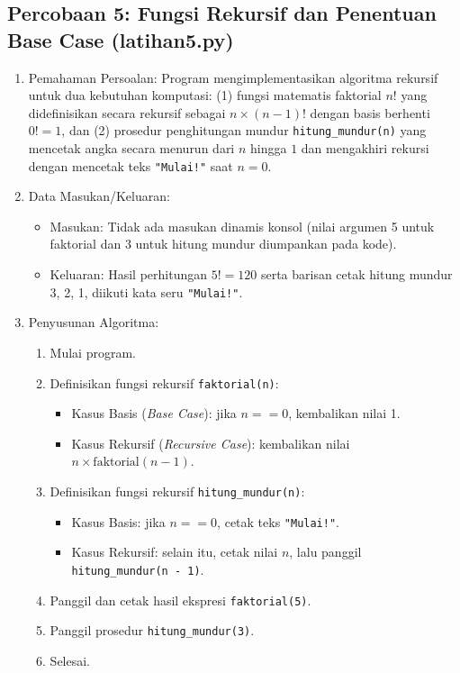 \documentclass[12pt,a4paper]{article}
\begin{document}
\subsection{Percobaan 5: Fungsi Rekursif dan Penentuan Base Case (latihan5.py)}
\begin{enumerate}
    \item Pemahaman Persoalan: Program mengimplementasikan algoritma rekursif untuk dua kebutuhan komputasi: (1) fungsi matematis faktorial $n!$ yang didefinisikan secara rekursif sebagai $n \times (n-1)!$ dengan basis berhenti $0! = 1$, dan (2) prosedur penghitungan mundur \texttt{hitung\_mundur(n)} yang mencetak angka secara menurun dari $n$ hingga $1$ dan mengakhiri rekursi dengan mencetak teks \texttt{"Mulai!"} saat $n = 0$.
    \item Data Masukan/Keluaran:
    \begin{itemize}
        \item Masukan: Tidak ada masukan dinamis konsol (nilai argumen 5 untuk faktorial dan 3 untuk hitung mundur diumpankan pada kode).
        \item Keluaran: Hasil perhitungan $5! = 120$ serta barisan cetak hitung mundur 3, 2, 1, diikuti kata seru \texttt{"Mulai!"}.
    \end{itemize}
    \item Penyusunan Algoritma:
    \begin{enumerate}[label=\alph*.]
        \item Mulai program.
        \item Definisikan fungsi rekursif \texttt{faktorial(n)}:
        \begin{itemize}
            \item Kasus Basis (\textit{Base Case}): jika $n == 0$, kembalikan nilai 1.
            \item Kasus Rekursif (\textit{Recursive Case}): kembalikan nilai $n \times \text{faktorial}(n - 1)$.
        \end{itemize}
        \item Definisikan fungsi rekursif \texttt{hitung\_mundur(n)}:
        \begin{itemize}
            \item Kasus Basis: jika $n == 0$, cetak teks \texttt{"Mulai!"}.
            \item Kasus Rekursif: selain itu, cetak nilai $n$, lalu panggil \texttt{hitung\_mundur(n - 1)}.
        \end{itemize}
        \item Panggil dan cetak hasil ekspresi \texttt{faktorial(5)}.
        \item Panggil prosedur \texttt{hitung\_mundur(3)}.
        \item Selesai.
    \end{enumerate}
\end{enumerate}
\end{document}
